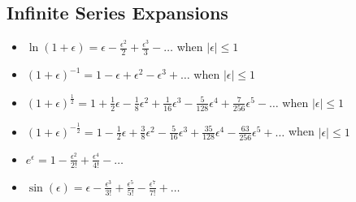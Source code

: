\documentclass[10pt, letterpaper, notitlepage, landscape]{article}
\begin{document}
\subsection{Infinite Series Expansions}
\begin{itemize}
  \item $\ln(1+\epsilon) = \epsilon - \frac{\epsilon^2}{2} + \frac{\epsilon^3}{3} - \dots$ when $|\epsilon| \le 1$
  \item $(1+\epsilon)^{-1} = 1 - \epsilon + \epsilon^2 - \epsilon^3 + \dots$ when $|\epsilon| \le 1$
  \item $(1+\epsilon)^{\frac{1}{2}} = 1 + \frac{1}{2} \epsilon - \frac{1}{8} \epsilon^2 + \frac{1}{16} \epsilon^3 - \frac{5}{128} \epsilon^4 + \frac{7}{256} \epsilon^5 - \dots$ when $|\epsilon| \le 1$
  \item $(1+\epsilon)^{-\frac{1}{2}} = 1 - \frac{1}{2} \epsilon + \frac{3}{8} \epsilon^2 - \frac{5}{16} \epsilon^3 + \frac{35}{128} \epsilon^4 - \frac{63}{256} \epsilon^5 + \dots$ when $|\epsilon| \le 1$
  \item $e^{\epsilon} = 1 - \frac{\epsilon^2}{2!} + \frac{\epsilon^4}{4!} - \dots$
  \item $\sin(\epsilon) = \epsilon - \frac{\epsilon^3}{3!} + \frac{\epsilon^5}{5!} - \frac{\epsilon^7}{7!} + \dots$ 
\end{itemize}
\end{document}
